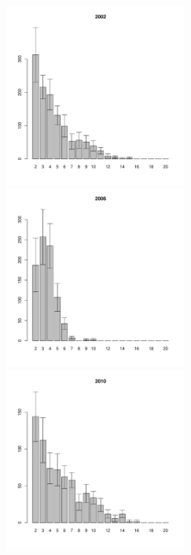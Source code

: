 \documentclass[12pt, a4paper]{article}
\begin{document}
\begin{figure}[h]


\begin{multicols}{3}
\hfill
\includegraphics[width=60mm]{../White_Sea/Ryashkov_YuG/YuG2_2002_.pdf}
\hfill
\includegraphics[width=60mm]{../White_Sea/Ryashkov_YuG/YuG2_2006_.pdf}
\hfill
\includegraphics[width=60mm]{../White_Sea/Ryashkov_YuG/YuG2_2010_.pdf}
\end{multicols}



\end{figure}
\end{document}
